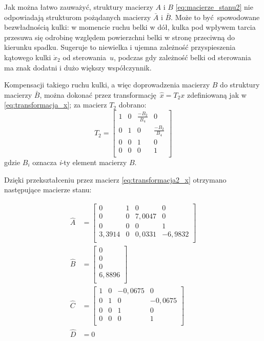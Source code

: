 Jak można łatwo zauważyć, struktury macierzy $A$ i $B$ \eqref{eq:macierze_stanu2} nie odpowiadają strukturom pożądanych macierzy $\bar{A}$ i $\bar{B}$. Może to być spowodowane bezwładnością kulki: w momencie ruchu belki w dół, kulka pod wpływem tarcia przesuwa się odrobinę względem powierzchni belki w stronę przeciwną do kierunku spadku. Sugeruje to niewielka i ujemna zależność przyspieszenia kątowego kulki $\dot{x}_2$ od sterowania~$u$, podczas gdy zależność belki od sterowania ma znak dodatni i dużo większy współczynnik.

Kompensacji takiego ruchu kulki, a więc doprowadzenia macierzy $B$ do struktury macierzy $\bar{B}$, można dokonać przez transformację $\hat{x} = T_2 x$ zdefiniowaną jak w \eqref{eq:transformacja_x}; za macierz $T_2$ dobrano:
\begin{equation}\label{eq:transformacja2_x}
    T_2 = \begin{bmatrix}
        1 & 0 & \frac{-B_2}{B_4} & 0 \\
        0 & 1 & 0 & \frac{-B_2}{B_4} \\
        0 & 0 & 1 & 0 \\
        0 & 0 & 0 & 1 \\
    \end{bmatrix}
\end{equation}
gdzie $B_i$ oznacza \textit{i}-ty element macierzy $B$.

Dzięki przekształceniu przez macierz \eqref{eq:transformacja2_x} otrzymano następujące macierze stanu:

\begin{align}
    \hat{A} &= \begin{bmatrix}
    0 & 1 & 0 & 0 \\
    0 & 0 & 7,0047 & 0 \\
    0 & 0 & 0 & 1 \\
    3,3914 & 0 & 0,0331 & -6,9832 \\
    \end{bmatrix} \nonumber \\
    \hat{B} &= \begin{bmatrix}
    0 \\
    0 \\
    0 \\
    6,8896 \\
    \end{bmatrix} \nonumber \\
    \hat{C} &= \begin{bmatrix}
    1 & 0 & -0,0675 & 0 \\
    0 & 1 & 0 & -0,0675 \\
    0 & 0 & 1 & 0 \\
    0 & 0 & 0 & 1 \\
    \end{bmatrix} \nonumber \\
    \hat{D} &= 0 \label{eq:macierze_stanu3}
\end{align}

